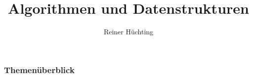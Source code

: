 

\title{Algorithmen und Datenstrukturen}
\author{Reiner Hüchting}


    \begin{frame}
        \titlepage
    \end{frame}

    \begin{frame}
        \frametitle{Themenüberblick}
        \tableofcontents[hideallsubsections]
    \end{frame}
